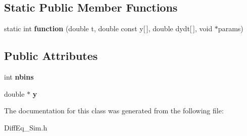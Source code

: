 \subsection*{Static Public Member Functions}
\begin{DoxyCompactItemize}
\item 
\hypertarget{classDiffEq__Sim_a5eb1630bf8e5e80a40d44a006ae6c6bf}{}static int {\bfseries function} (double t, double const y\mbox{[}$\,$\mbox{]}, double dydt\mbox{[}$\,$\mbox{]}, void $\ast$params)\label{classDiffEq__Sim_a5eb1630bf8e5e80a40d44a006ae6c6bf}

\end{DoxyCompactItemize}
\subsection*{Public Attributes}
\begin{DoxyCompactItemize}
\item 
\hypertarget{classDiffEq__Sim_ace3d849259ca643078e87c2b8aaf6eb6}{}int {\bfseries nbins}\label{classDiffEq__Sim_ace3d849259ca643078e87c2b8aaf6eb6}

\item 
\hypertarget{classDiffEq__Sim_a67f5c9d51402d1ff94f3f9bd7f021475}{}double $\ast$ {\bfseries y}\label{classDiffEq__Sim_a67f5c9d51402d1ff94f3f9bd7f021475}

\end{DoxyCompactItemize}


The documentation for this class was generated from the following file\+:\begin{DoxyCompactItemize}
\item 
Diff\+Eq\+\_\+\+Sim.\+h\end{DoxyCompactItemize}
